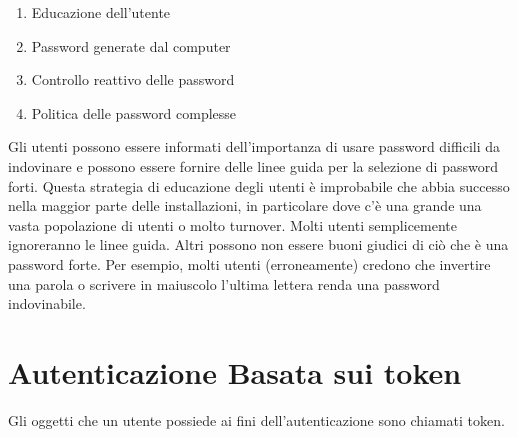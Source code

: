 \begin{enumerate}
    \item Educazione dell'utente
    \item Password generate dal computer
    \item Controllo reattivo delle password
    \item Politica delle password complesse
\end{enumerate}

\singlespacing
Gli utenti possono essere informati dell'importanza di usare password difficili da indovinare e possono essere fornire delle linee guida per la selezione di password forti. Questa strategia di educazione degli utenti è improbabile che abbia successo nella maggior parte delle installazioni, in particolare dove c'è una grande una vasta popolazione di utenti o molto turnover. Molti utenti semplicemente ignoreranno le linee guida. Altri possono non essere buoni giudici di ciò che è una password forte. Per esempio, molti utenti (erroneamente) credono che invertire una parola o scrivere in maiuscolo l'ultima lettera renda una password indovinabile.

\newpage
\section{Autenticazione Basata sui token}
Gli oggetti che un utente possiede ai fini dell'autenticazione sono chiamati token.


